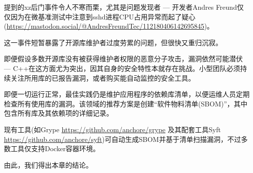 提到的xz后门事件令人不寒而栗，尤其是问题发现者 --- 开发者Andres Freund仅仅因为在微基准测试中注意到sshd进程CPU占用异常而起了疑心(\url{https://mastodon.social/@AndresFreundTec/112180406142695845})。

这一事件短暂暴露了开源库维护者过度劳累的问题，但很快又重归沉寂。

即便假设多数开源库没有被获得维护者权限的恶意分子攻击，漏洞依然可能潜伏 --- C++在这方面尤为突出，因其自身的安全特性本就存在挑战。小型团队必须持续关注所用库的已报告漏洞，或者购买能自动监控的安全工具。

即便一切运行正常，最佳实践仍是维护应用程序的依赖库清单，以便运维人员定期检查所有使用库的漏洞。该领域的推荐方案是创建“软件物料清单(SBOM)”，其中包含所有库及其依赖项的详细记录。

现有工具(如Grype \url{https://github.com/anchore/grype} 及其配套工具Syft \url{https://github.com/anchore/syft})可自动生成SBOM并基于清单扫描漏洞，不过多数工具仅支持Docker容器环境。

由此，我们得出本章的结论。







